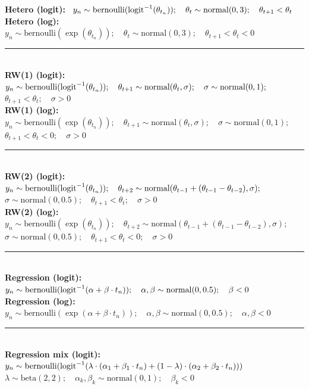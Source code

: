 \documentclass[plainboxedsections, 25pt]{sciposter}
\begin{document}
\begin{multicols}{2}
{\bfseries Hetero (logit):} \
$y_n \sim \textrm{bernoulli}(\textrm{logit}^{-1}(\theta_{t_n}));
\quad \theta_t \sim 
\textrm{normal}(0, 3);
\quad \theta_{t+1} < \theta_t$
\\[12pt]
{\bfseries Hetero (log):} \
$y_n \sim \textrm{bernoulli}(\exp(\theta_{t_n}));
\quad \theta_t \sim \textrm{normal}(0, 3);
\quad \theta_{t+1} < \theta_t < 0$
%
\\ \hrule \mbox{}\\[6pt]
%
{\bfseries RW(1) (logit):} \
$y_n \sim \textrm{bernoulli}(\textrm{logit}^{-1}(\theta_{t_n}));
\quad \theta_{t+1} \sim \textrm{normal}(\theta_t, \sigma);
\quad \sigma \sim \textrm{normal}(0, 1);$
\\[2pt]
\null\qquad\qquad\qquad\qquad $\theta_{t+1} < \theta_t; 
\quad \sigma > 0$
\\[12pt]
{\bfseries RW(1) (log):} \
$y_n \sim \textrm{bernoulli}(\exp(\theta_{t_n}));
\quad \theta_{t+1} \sim \textrm{normal}(\theta_t, \sigma);
\quad \sigma \sim \textrm{normal}(0, 1);$
\\[2pt]
\null\qquad\qquad\qquad\qquad $\theta_{t+1} < \theta_t < 0;
\quad \sigma > 0$
%
\\ \hrule \mbox{}\\[6pt]
%
{\bfseries RW(2) (logit):} \
$y_n \sim \textrm{bernoulli}(\textrm{logit}^{-1}(\theta_{t_n})); 
\quad \theta_{t+2} \sim \textrm{normal}(\theta_{t-1} + (\theta_{t-1} - \theta_{t-2}), \sigma);$
\\[2pt]
\null\qquad\qquad\qquad\qquad $\sigma \sim \textrm{normal}(0, 0.5); 
\quad \theta_{t+1} < \theta_t; 
\quad \sigma > 0$
\\[12pt]
{\bfseries RW(2) (log):} \
$y_n \sim \textrm{bernoulli}(\exp(\theta_{t_n})); 
\quad \theta_{t+2} \sim \textrm{normal}(\theta_{t-1} + (\theta_{t-1} - \theta_{t-2}), \sigma);$
\\[2pt]
\null\qquad\qquad\qquad\qquad $\sigma \sim \textrm{normal}(0, 0.5); 
\quad \theta_{t+1} < \theta_t < 0; 
\quad \sigma > 0$
%
\\ \hrule \mbox{}\\[6pt]
%
{\bfseries Regression (logit):} \
$y_n \sim \textrm{bernoulli}(\textrm{logit}^{-1}(\alpha + \beta \cdot t_n));
\quad \alpha, \beta \sim \textrm{normal}(0, 0.5);
\quad \beta < 0$
\\[12pt]
{\bfseries Regression (log):} \
$y_n \sim \textrm{bernoulli}(\exp(\alpha + \beta \cdot t_n));
\quad \alpha, \beta \sim \textrm{normal}(0, 0.5); \quad \alpha, \beta < 0$
%
\\ \hrule \mbox{}\\[6pt]
%
{\bfseries Regression mix (logit):}
$y_n \sim \textrm{bernoulli}(\textrm{logit}^{-1}(\lambda \cdot (\alpha_1 + \beta_1 \cdot t_n) + (1 - \lambda) \cdot (\alpha_2 + \beta_2 \cdot t_n)))$
\\[2pt]
\null\qquad\qquad\qquad\qquad $\lambda \sim \textrm{beta}(2, 2);
\quad \alpha_k, \beta_k \sim \textrm{normal}(0, 1);
\quad \beta_k < 0$





\end{multicols}
\end{document}
